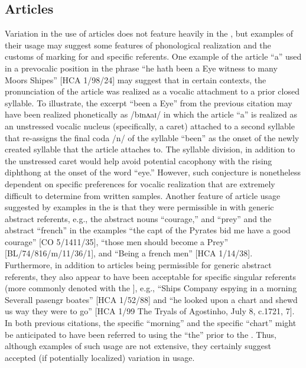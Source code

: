 \subsection{{Articles}}\label{sec:5.3.5}

Variation in the use of  articles does not feature heavily in the , but examples of their usage may suggest some features of phonological realization and the customs of marking for  and specific referents. One example of the  article “a” used in a prevocalic position in the phrase “he hath been a Eye witness to many Moors Shipes” [HCA 1/98/24] may suggest that in certain contexts, the pronunciation of the article was realized as a vocalic attachment to a prior closed syllable. To illustrate, the excerpt “been a Eye” from the previous citation may have been realized phonetically as /b{ɪ}nʌ{aɪ/ in which the article “a” is realized as an unstressed vocalic nucleus (specifically, a caret) attached to a second syllable that re-assigns the final coda /n/ of the syllable “been” as the onset of the newly created syllable that the article attaches to. The syllable division, in addition to the unstressed caret would help avoid potential cacophony with the rising diphthong at the onset of the word “eye.” However, such conjecture is nonetheless dependent on specific preferences for vocalic realization that are extremely difficult to determine from written samples. Another feature of  article usage suggested by examples in the  is that they were permissible in  with generic abstract referents, e.g., the abstract nouns “courage,” and “prey” and the abstract  “french” in the examples} “the capt of the Pyrates bid me have a good courage” [CO 5/1411/35], “those men should become a Prey” [BL/74/816/m/11/36/1], and “Being a french men” [HCA 1/14/38]. Furthermore, in addition to  articles being {permissible for generic abstract referents, they also appear to have been acceptable for specific singular referents (more commonly denoted with the ], e.g.,} “Ships Company espying in a morning Severall pasengr boates” [HCA 1/52/88] and “he looked upon a chart and shewd us way they were to go” [HCA 1/99 The Tryals of Agostinho, July 8, c.1721, 7]. In both previous citations, the specific “morning” and the specific “chart” might be anticipated to have been referred to using the  “the” prior to the . Thus, although examples of such usage are not extensive, they certainly suggest accepted (if potentially localized) variation in usage. 

